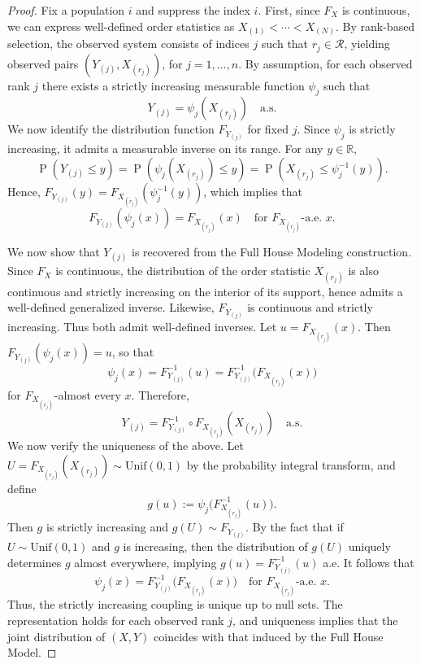 \documentclass[12pt]{article}
\DeclareMathOperator*{\Prob}{P}
\begin{document}
\begin{proof}
Fix a population $i$ and suppress the index $i$. First, since $F_X$ is continuous, we can express well-defined order statistics as $X_{(1)} < \cdots < X_{(N)}$. By rank-based selection, the observed system consists of indices $j$ such that $r_j \in \mathcal{R}$, yielding observed pairs $(Y_{(j)}, X_{(r_j)})$, for $j = 1,\dots,n$. By assumption, for each observed rank $j$ there exists a strictly increasing measurable function $\psi_j$ such that
$$
  Y_{(j)} = \psi_j(X_{(r_j)}) \quad \text{a.s.}
$$
We now identify the distribution function $F_{Y_{(j)}}$ for fixed $j$. Since $\psi_j$ is strictly increasing, it admits a measurable inverse on its range. For any $y \in \mathbb{R}$,
$$
\Prob(Y_{(j)} \le y) 
	= \Prob(\psi_j(X_{(r_j)}) \le y)
    = \Prob(X_{(r_j)} \le \psi_j^{-1}(y)).
$$
Hence, $F_{Y_{(j)}}(y) = F_{X_{(r_j)}}(\psi_j^{-1}(y))$, which implies that
$$
  F_{Y_{(j)}}(\psi_j(x)) = F_{X_{(r_j)}}(x)
	\quad \text{for } F_{X_{(r_j)}}\text{-a.e. } x.
$$

We now show that $Y_{(j)}$ is recovered from the Full House Modeling construction. Since $F_X$ is continuous, the distribution of the order statistic $X_{(r_j)}$ is also continuous and strictly increasing on the interior of its support, hence admits a well-defined generalized inverse. Likewise, $F_{Y_{(j)}}$ is continuous and strictly increasing. Thus both admit well-defined inverses. Let $u = F_{X_{(r_j)}}(x)$. Then $F_{Y_{(j)}}(\psi_j(x)) = u$, so that 
$$
\psi_j(x)
	= F_{Y_{(j)}}^{-1}(u)
	= F_{Y_{(j)}}^{-1}\!\big(F_{X_{(r_j)}}(x)\big)
$$
for $F_{X_{(r_j)}}$-almost every $x$. Therefore,
$$
Y_{(j)} = F_{Y_{(j)}}^{-1} \circ F_{X_{(r_j)}}(X_{(r_j)})
	\quad \text{a.s.}	
$$
We now verify the uniqueness of the above. Let $U = F_{X_{(r_j)}}(X_{(r_j)}) \sim \mathrm{Unif}(0,1)$ by the probability integral transform, and define
$$
  g(u) := \psi_j\!\big(F_{X_{(r_j)}}^{-1}(u)\big).
$$
Then $g$ is strictly increasing and $g(U) \sim F_{Y_{(j)}}$. By the fact that if $U\sim\mathrm{Unif}(0,1)$ and $g$ is increasing, then the distribution of $g(U)$ uniquely determines $g$ almost everywhere, implying $g(u)=F^{-1}_{Y_{(j)}}(u)$ a.e. It follows that 
$$
\psi_j(x) = F_{Y_{(j)}}^{-1}\!\big(F_{X_{(r_j)}}(x)\big)
	\quad \text{for } F_{X_{(r_j)}}\text{-a.e. } x.
$$
Thus, the strictly increasing coupling is unique up to null sets. The representation holds for each observed rank $j$, and uniqueness implies that the joint distribution of $(X,Y)$ coincides with that induced by the Full House Model.
\end{proof}
\end{document}
